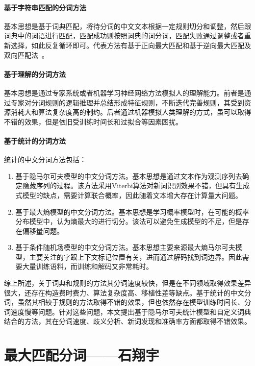 \documentclass[11pt,a4paper]{article}
\begin{document}
	\paragraph{基于字符串匹配的分词方法}
	基本思想是基于词典匹配，将待分词的中文文本根据一定规则切分和调整，然后跟词典中的词语进行匹配，匹配成功则按照词典的词分词，匹配失败通过调整或者重新选择，如此反复循环即可。代表方法有基于正向最大匹配和基于逆向最大匹配及双向匹配法~\citep{edmonds1965maximum}。
	
	\paragraph{基于理解的分词方法}
	基本思想是通过专家系统或者机器学习神经网络方法模拟人的理解能力。前者是通过专家对分词规则的逻辑推理并总结形成特征规则，不断迭代完善规则，其受到资源消耗大和算法复杂度高的制约。后者通过机器模拟人类理解的方式，虽可以取得不错的效果，但是依旧受训练时间长和过拟合等因素困扰。
	
	\paragraph{基于统计的分词方法}
	统计的中文分词方法包括：
	
	\begin{enumerate}
		\item 
		基于隐马尔可夫模型的中文分词方法。基本思想是通过文本作为观测序列去确定隐藏序列的过程。该方法采用Viterbi算法对新词识别效果不错，但具有生成式模型的缺点，需要计算联合概率，因此随着文本增大存在计算量大问题。
		\item 基于最大熵模型的中文分词方法。基本思想是学习概率模型时，在可能的概率分布模型中，认为熵最大的进行切分。该法可以避免生成模型的不足，但是存在偏移量问题。
		\item 基于条件随机场模型的中文分词方法。基本思想主要来源最大熵马尔可夫模型，主要关注的字跟上下文标记位置有关，进而通过解码找到词边界。因此需要大量训练语料，而训练和解码又非常耗时。
	\end{enumerate}
	
	综上所述，关于词典和规则的方法其分词速度较快，但是在不同领域取得效果差异很大，还存在构造费时费力、算法复杂度高、移植性差等缺点。基于统计的中文分词，虽然其相较于规则的方法取得不错的效果，但也依然存在模型训练时间长、分词速度慢等问题。针对这些问题，本文提出基于隐马尔可夫统计模型和自定义词典结合的方法，其在分词速度、歧义分析、新词发现和准确率方面都取得不错效果。
	
	\section{最大匹配分词——石翔宇}
	
\end{document}
